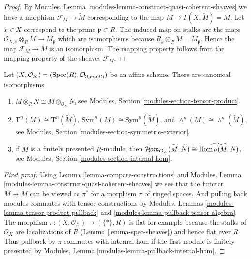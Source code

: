 \begin{proof}
By Modules, Lemma \ref{modules-lemma-construct-quasi-coherent-sheaves}
we have a morphism $\mathcal{F}_M \to \widetilde M$ corresponding
to the map $M \to \Gamma(X, \widetilde M) = M$. Let $x \in X$
correspond to the prime $\mathfrak p \subset R$.
The induced map on stalks are the maps
$\mathcal{O}_{X, x} \otimes_R M \to M_{\mathfrak p}$
which are isomorphisms because
$R_{\mathfrak p} \otimes_R M = M_{\mathfrak p}$.
Hence the map $\mathcal{F}_M \to \widetilde M$ is an isomorphism.
The mapping property follows from the mapping property of
the sheaves $\mathcal{F}_M$.
\end{proof}

\begin{lemma}
\label{lemma-widetilde-constructions}
Let $(X, \mathcal{O}_X) = (\mathop{\mathrm{Spec}}(R), \mathcal{O}_{\mathop{\mathrm{Spec}}(R)})$
be an affine scheme. There are canonical isomorphisms
\begin{enumerate}
\item
$
\widetilde{M \otimes_R N}
\cong
\widetilde M \otimes_{\mathcal{O}_X} \widetilde N
$,
see Modules, Section \ref{modules-section-tensor-product}.
\item
$
\widetilde{\text{T}^n(M)}
\cong
\text{T}^n(\widetilde M)
$,
$
\widetilde{\text{Sym}^n(M)}
\cong
\text{Sym}^n(\widetilde M)
$, and
$
\widetilde{\wedge^n(M)}
\cong
\wedge^n(\widetilde M)
$,
see
Modules, Section \ref{modules-section-symmetric-exterior}.
\item if $M$ is a finitely presented $R$-module, then
$
\mathop{\mathcal{H}\!\mathit{om}}\nolimits_{\mathcal{O}_X}(\widetilde M, \widetilde N)
\cong
\widetilde{\mathop{\mathrm{Hom}}\nolimits_R(M,  N)}
$,
see
Modules, Section \ref{modules-section-internal-hom}.
\end{enumerate}
\end{lemma}

\begin{proof}[First proof]
Using Lemma \ref{lemma-compare-constructions} and
Modules, Lemma \ref{modules-lemma-construct-quasi-coherent-sheaves}
we see that the functor $M \mapsto \widetilde M$ can be viewed
as $\pi^*$ for a morphism $\pi$ of ringed spaces.
And pulling back modules commutes with tensor constructions by
Modules, Lemmas \ref{modules-lemma-tensor-product-pullback}
and \ref{modules-lemma-pullback-tensor-algebra}.
The morphism $\pi : (X, \mathcal{O}_X) \to (\{*\}, R)$ is
flat for example because the stalks of $\mathcal{O}_X$ are
localizations of $R$ (Lemma \ref{lemma-spec-sheaves})
and hence flat over $R$. Thus pullback by $\pi$ commutes
with internal hom if the first module is finitely presented by
Modules, Lemma \ref{modules-lemma-pullback-internal-hom}.
\end{proof}

